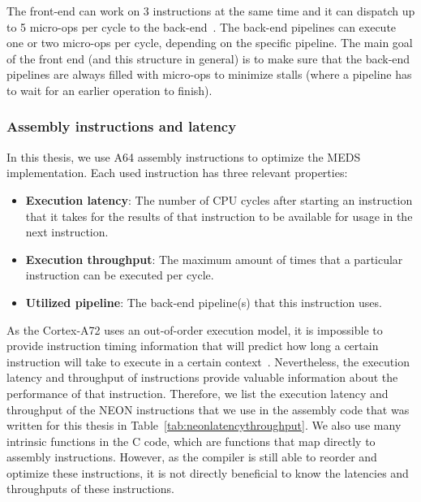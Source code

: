 \documentclass[11pt,a4paper]{report}
\theoremstyle{definition}
\begin{document}
The front-end can work on 3 instructions at the same time and it can dispatch up to 5 micro-ops per cycle to the back-end~\cite{SandSoftwaresound2024}. The back-end pipelines can execute one or two micro-ops per cycle, depending on the specific pipeline. The main goal of the front end (and this structure in general) is to make sure that the back-end pipelines are always filled with micro-ops to minimize stalls (where a pipeline has to wait for an earlier operation to finish).

\subsubsection{Assembly instructions and latency}
In this thesis, we use A64 assembly instructions to optimize the MEDS implementation. Each used instruction has three relevant properties:
\begin{itemize}
  \item \textbf{Execution latency}: The number of CPU cycles after starting an instruction that it takes for the results of that instruction to be available for usage in the next instruction.
  \item \textbf{Execution throughput}: The maximum amount of times that a particular instruction can be executed per cycle.
  \item \textbf{Utilized pipeline}: The back-end pipeline(s) that this instruction uses.
\end{itemize}

As the Cortex-A72 uses an out-of-order execution model, it is impossible to provide instruction timing information that will predict how long a certain instruction will take to execute in a certain context~\cite{CortexA72OptGuide}. Nevertheless, the execution latency and throughput of instructions provide valuable information about the performance of that instruction. Therefore, we list the execution latency and throughput of the NEON instructions that we use in the assembly code that was written for this thesis in Table~\ref{tab:neonlatencythroughput}. We also use many intrinsic functions in the C code, which are functions that map directly to assembly instructions. However, as the compiler is still able to reorder and optimize these instructions, it is not directly beneficial to know the latencies and throughputs of these instructions.
\end{document}
